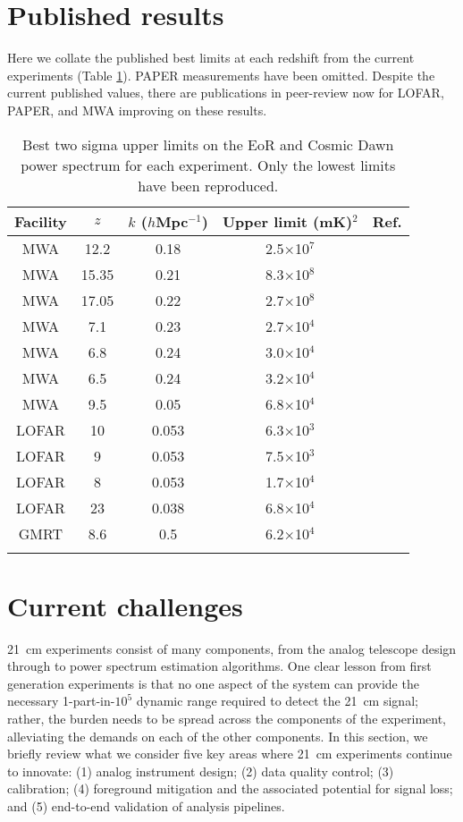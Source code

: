 \section{Published results}
\label{sec:results}
Here we collate the published best limits at each redshift from the current experiments (Table \ref{table:limits}). PAPER measurements have been omitted. Despite the current published values, there are publications in peer-review now for LOFAR, PAPER, and MWA improving on these results.
\begin{table}[ht]
\centering
\begin{tabular}{|c|c|c|c|c|}
\hline 
Facility & $z$ & $k$ ($h$Mpc$^{-1}$) & Upper limit (mK)$^2$ & Ref. \\
\hline
MWA & 12.2 & 0.18 & 2.5$\times$10$^7$ & \cite{ewall-wice16}\\
MWA & 15.35 & 0.21 & 8.3$\times$10$^8$ & \cite{ewall-wice16}\\
MWA & 17.05 & 0.22 & 2.7$\times$10$^8$ & \cite{ewall-wice16}\\
MWA & 7.1 & 0.23 & 2.7$\times$10$^4$ & \cite{beardsley16}\\
MWA & 6.8 & 0.24 & 3.0$\times$10$^4$ & \cite{beardsley16}\\
MWA & 6.5 & 0.24 & 3.2$\times$10$^4$ & \cite{beardsley16}\\
MWA & 9.5 & 0.05 & 6.8$\times$10$^4$ & \cite{dillon15}\\
LOFAR & 10 & 0.053 & 6.3$\times$10$^3$ & \cite{patil16}\\
LOFAR & 9 & 0.053 & 7.5$\times$10$^3$ & \cite{patil16}\\
LOFAR & 8 & 0.053 & 1.7$\times$10$^4$ & \cite{patil16}\\
LOFAR & 23 & 0.038 & 6.8$\times$10$^4$ & \cite{2018arXiv180906661G}\\
GMRT & 8.6 & 0.5 & 6.2$\times$10$^4$ & \cite{paciga13}\\
\hline
\label{table:limits}
\end{tabular}
\caption{Best two sigma upper limits on the EoR and Cosmic Dawn power spectrum for each experiment. Only the lowest limits have been reproduced.}
\end{table}


\section{Current challenges}
\label{sec:challenges}
21~cm experiments consist of many components, from the analog telescope design through to power spectrum estimation algorithms.  One clear lesson from first generation experiments is that no one aspect of the system can provide the necessary 1-part-in-$10^5$ dynamic range required to detect the 21~cm signal; rather, the burden needs to be spread across the components of the experiment, alleviating the demands on each of the other components.  In this section, we briefly review what we consider five key areas where 21~cm experiments continue to innovate: (1) analog instrument design; (2) data quality control; (3) calibration; (4) foreground mitigation and the associated potential for signal loss; and (5) end-to-end validation of analysis pipelines.

